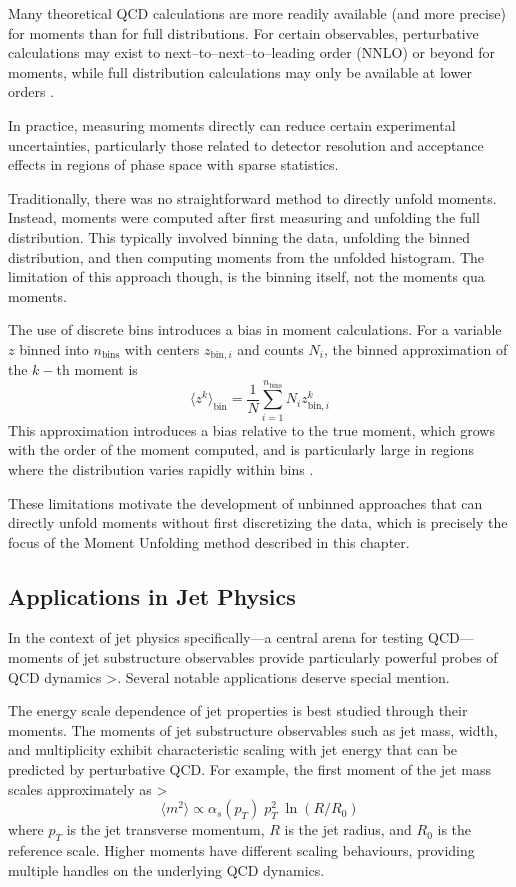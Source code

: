         Many theoretical QCD calculations are more readily available (and more precise) for moments than for full distributions.
        For certain observables, perturbative calculations may exist to next--to--next--to--leading order (NNLO) or beyond for moments, while full distribution calculations may only be available at lower orders .
        
        In practice, measuring moments directly can reduce certain experimental uncertainties, particularly those related to detector resolution and acceptance effects in regions of phase space with sparse statistics.

        Traditionally, there was no straightforward method to directly unfold moments.
        Instead, moments were computed after first measuring and unfolding the full distribution.
        This typically involved binning the data, unfolding the binned distribution, and then computing moments from the unfolded histogram.
        The limitation of this approach though, is the binning itself, not the moments qua moments.
        
        The use of discrete bins introduces a bias in moment calculations.
        For a variable $z$ binned into $n_{\text{bins}}$ with centers $z_{\text{bin},i}$ and counts $N_i$, the binned approximation of the $k-$th moment is
        \[
            \langle z^k \rangle_{\text{bin}} = \frac{1}{N} \sum_{i=1}^{n_{\text{bins}}} N_i z_{\text{bin},i}^k
        \]
        This approximation introduces a bias relative to the true moment, which grows with the order of the moment computed, and is particularly large in regions where the distribution varies rapidly within bins .

        These limitations motivate the development of unbinned approaches that can directly unfold moments without first discretizing the data, which is precisely the focus of the Moment Unfolding method described in this chapter.
    \subsection{Applications in Jet Physics}
        In the context of jet physics specifically---a central arena for testing QCD---moments of jet substructure observables provide particularly powerful probes of QCD dynamics >.
        Several notable applications deserve special mention.
        
        The energy scale dependence of jet properties is best studied through their moments.
        The moments of jet substructure observables such as jet mass, width, and multiplicity exhibit characteristic scaling with jet energy that can be predicted by perturbative QCD. For example, the first moment of the jet mass scales approximately as >
        \[
            \langle m^2 \rangle \propto \alpha_s(p_T) \;p_T^2 \;\ln(R/R_0)
        \]
        where $p_T$ is the jet transverse momentum, $R$ is the jet radius, and $R_0$ is the reference scale.
        Higher moments have different scaling behaviours, providing multiple handles on the underlying QCD dynamics.

